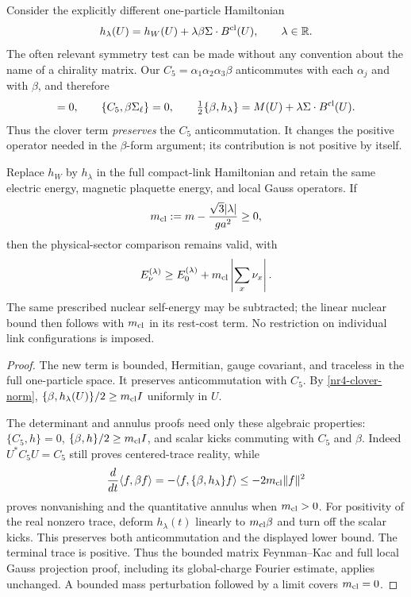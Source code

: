 Consider the explicitly different one-particle Hamiltonian
\begin{equation}
 h_\lambda(U)=h_W(U)+\lambda\beta\Sigma\cdot B^{\rm cl}(U),
 \qquad \lambda\in\mathbb R.
 \label{nr4-clover-h}
\end{equation}
The often relevant symmetry test can be made without any convention
about the name of a chirality matrix. Our $C_5=\alpha_1\alpha_2\alpha_3\beta$
anticommutes with each $\alpha_j$ and with $\beta$, and therefore
\begin{equation}
 [C_5,\Sigma_\ell]=0,\qquad
 \{C_5,\beta\Sigma_\ell\}=0,\qquad
 \tfrac12\{\beta,h_\lambda\}
 =M(U)+\lambda\Sigma\cdot B^{\rm cl}(U).
 \label{nr4-clover-algebra}
\end{equation}
Thus the clover term \emph{preserves} the $C_5$ anticommutation.
It changes the positive operator needed in the $\beta$-form argument;
its contribution is not positive by itself.

\begin{proposition}
\label{nr4-clover-positive}
Replace $h_W$ by $h_\lambda$ in the full compact-link Hamiltonian and
retain the same electric energy, magnetic plaquette energy, and local
Gauss operators. If
\begin{equation}
 m_{\rm cl}:=m-\frac{\sqrt3|\lambda|}{ga^2}\ge0,
 \label{nr4-clover-mass}
\end{equation}
then the physical-sector comparison remains valid, with
\begin{equation}
 E_\nu^{(\lambda)}\ge E_0^{(\lambda)}
                         +m_{\rm cl}\left|\sum_x\nu_x\right|.
 \label{nr4-clover-stability}
\end{equation}
The same prescribed nuclear self-energy may be subtracted; the
linear nuclear bound then follows with $m_{\rm cl}$ in its rest-cost
term. No restriction on individual link configurations is imposed.
\end{proposition}
\begin{proof}
The new term is bounded, Hermitian, gauge covariant, and traceless in
the full one-particle space. It preserves anticommutation with $C_5$.
By \eqref{nr4-clover-norm},
$\{\beta,h_\lambda(U)\}/2\ge m_{\rm cl}I$ uniformly in $U$.

The determinant and annulus proofs need only these algebraic
properties: $\{C_5,h\}=0$, $\{\beta,h\}/2\ge m_{\rm cl}I$,
and scalar kicks commuting with $C_5$ and $\beta$.
Indeed $U^*C_5U=C_5$ still proves centered-trace reality, while
\[
 \frac d{dt}\langle f,\beta f\rangle
 =-\langle f,\{\beta,h_\lambda\}f\rangle
 \le-2m_{\rm cl}\|f\|^2
\]
proves nonvanishing and the quantitative annulus when $m_{\rm cl}>0$.
For positivity of the real nonzero trace, deform $h_\lambda(t)$ linearly
to $m_{\rm cl}\beta$ and turn off the scalar kicks. This preserves
both anticommutation and the displayed lower bound. The terminal
trace is positive. Thus the bounded matrix Feynman--Kac and full local
Gauss projection proof, including its global-charge Fourier estimate,
applies unchanged. A bounded mass perturbation followed by a limit
covers $m_{\rm cl}=0$.
\end{proof}

